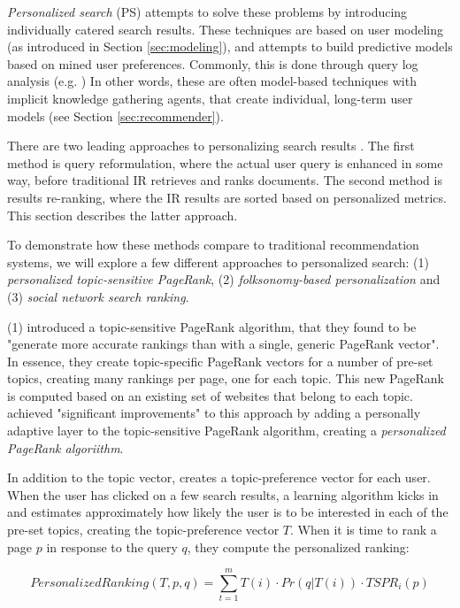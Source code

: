\emph{Personalized search} (PS) attempts to solve these problems by introducing individually catered search results. 
These techniques are based on user modeling (as introduced in Section \ref{sec:modeling}),
and attempts to build predictive models based on mined user preferences.
Commonly, this is done through query log analysis (e.g. \cite{Liu2002, Sugiyama2004, Shen2005, Speretta2000})
In other words, these are often model-based techniques with implicit knowledge gathering agents,
that create individual, long-term user models (see Section \ref{sec:recommender}).

There are two leading approaches to personalizing search results \cite[p2]{Noll2007}. 
The first method is query reformulation, where the actual user query is enhanced in some way, before traditional IR 
retrieves and ranks documents. The second method is results re-ranking, where the IR results are sorted
based on personalized metrics. This section describes the latter approach.

To demonstrate how these methods compare to traditional recommendation systems,
we will explore a few different approaches to personalized search: 
(1) \emph{personalized topic-sensitive PageRank},
(2) \emph{folksonomy-based personalization} and
(3) \emph{social network search ranking}.

(1) \citet{Haveliwala2003} introduced a topic-sensitive PageRank algorithm, that they found
to be "generate more accurate rankings than with a single, generic PageRank vector". 
In essence, they create topic-specific PageRank vectors for a number of pre-set topics,
creating many rankings per page, one for each topic.
This new PageRank is computed based on an existing set of websites that belong to each topic.
\citet{Qiu2006} achieved "significant improvements" to this approach by adding a personally adaptive layer
to the topic-sensitive PageRank algorithm, creating a \emph{personalized PageRank algoriithm}. 

In addition to the topic vector, \citeauthor{Qiu2006}
creates a topic-preference vector for each user. When the user has clicked on a few search results,
a learning algorithm kicks in and estimates approximately how likely the user is to be interested 
in each of the pre-set topics, creating the topic-preference vector $T$. When it is time to rank a 
page $p$ in response to the query $q$, they compute the personalized ranking:

\begin{equation*}
  PersonalizedRanking(T,p,q) = \sum_{t=1}^{m} T(i) \cdot Pr(q|T(i)) \cdot TSPR_i(p)
\end{equation*}

